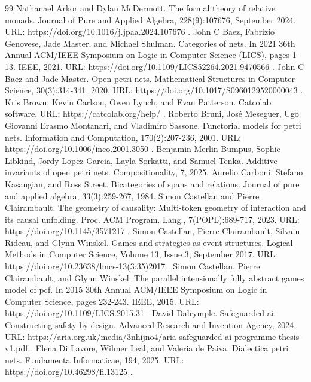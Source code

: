 \documentclass[10pt,a4paper]{amsart}
\begin{document}
\begin{thebibliography}{99}
 Nathanael Arkor and Dylan McDermott. The formal theory of relative monads. Journal of Pure and Applied Algebra, 228(9):107676, September 2024. URL: https://doi.org/10.1016/j.jpaa.2024.107676 .
 John C Baez, Fabrizio Genovese, Jade Master, and Michael Shulman. Categories of nets. In 2021 36th Annual ACM/IEEE Symposium on Logic in Computer Science (LICS), pages 1-13. IEEE, 2021. URL: https://doi.org/10.1109/LICS52264.2021.9470566 .
 John C Baez and Jade Master. Open petri nets. Mathematical Structures in Computer Science, 30(3):314-341, 2020. URL: https://doi.org/10.1017/S0960129520000043 .
 Kris Brown, Kevin Carlson, Owen Lynch, and Evan Patterson. Catcolab software. URL: https://catcolab.org/help/ .
 Roberto Bruni, José Meseguer, Ugo Giovanni Erasmo Montanari, and Vladimiro Sassone. Functorial models for petri nets. Information and Computation, 170(2):207-236, 2001. URL: https://doi.org/10.1006/inco.2001.3050 .
 Benjamin Merlin Bumpus, Sophie Libkind, Jordy Lopez Garcia, Layla Sorkatti, and Samuel Tenka. Additive invariants of open petri nets. Compositionality, 7, 2025.
 Aurelio Carboni, Stefano Kasangian, and Ross Street. Bicategories of spans and relations. Journal of pure and applied algebra, 33(3):259-267, 1984.
 Simon Castellan and Pierre Clairambault. The geometry of causality: Multi-token geometry of interaction and its causal unfolding. Proc. ACM Program. Lang., 7(POPL):689-717, 2023. URL: https://doi.org/10.1145/3571217 .
 Simon Castellan, Pierre Clairambault, Silvain Rideau, and Glynn Winskel. Games and strategies as event structures. Logical Methods in Computer Science, Volume 13, Issue 3, September 2017. URL: https://doi.org/10.23638/lmcs-13(3:35)2017 .
 Simon Castellan, Pierre Clairambault, and Glynn Winskel. The parallel intensionally fully abstract games model of pcf. In 2015 30th Annual ACM/IEEE Symposium on Logic in Computer Science, pages 232-243. IEEE, 2015. URL: https://doi.org/10.1109/LICS.2015.31 .
 David Dalrymple. Safeguarded ai: Constructing safety by design. Advanced Research and Invention Agency, 2024. URL: https://aria.org.uk/media/3nhijno4/aria-safeguarded-ai-programme-thesis-v1.pdf .
 Elena Di Lavore, Wilmer Leal, and Valeria de Paiva. Dialectica petri nets. Fundamenta Informaticae, 194, 2025. URL: https://doi.org/10.46298/fi.13125 .

\end{thebibliography}
\end{document}
